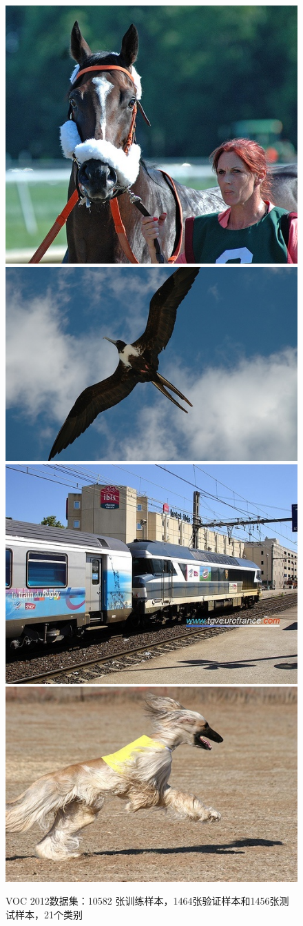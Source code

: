 \begin{figure}
	\centering
	\includegraphics[width=.25\textwidth,height=.15\textwidth]{demo_images/example/2007_000799.jpg}
	\includegraphics[width=.25\textwidth,height=.15\textwidth]{demo_images/example/2007_002094.jpg}
	\includegraphics[width=.25\textwidth,height=.15\textwidth]{demo_images/example/2007_004483.jpg}
	\includegraphics[width=.25\textwidth,height=.15\textwidth]{demo_images/example/2007_003194.jpg}
	\caption{VOC 2012数据集：10582 张训练样本，1464张验证样本和1456张测试样本，21个类别}
\end{figure}